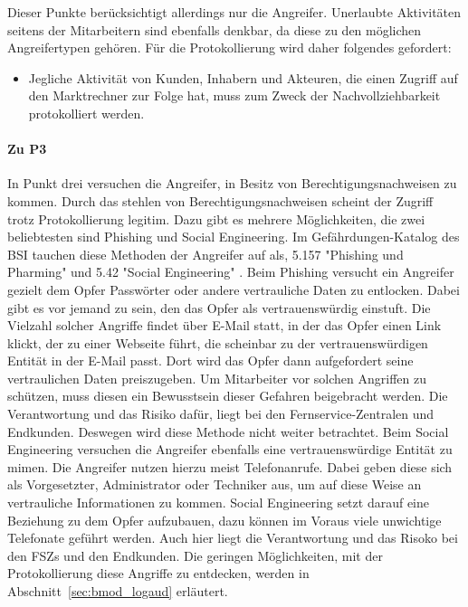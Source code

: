 \documentclass[11pt,a4paper]{report}
\begin{document}
Dieser Punkte berücksichtigt allerdings nur die Angreifer. Unerlaubte Aktivitäten seitens der Mitarbeitern sind ebenfalls denkbar, da diese zu den möglichen Angreifertypen gehören. Für die Protokollierung wird daher folgendes gefordert:

\begin{itemize}[leftmargin=*]
\item Jegliche Aktivität von Kunden, Inhabern und Akteuren, die einen Zugriff auf den Marktrechner zur Folge hat, muss zum Zweck der Nachvollziehbarkeit protokolliert werden.
\end{itemize}

\paragraph{Zu P3} In Punkt drei versuchen die Angreifer, in Besitz von Berechtigungsnachweisen zu kommen. Durch das stehlen von Berechtigungsnachweisen scheint der Zugriff trotz Protokollierung legitim. Dazu gibt es mehrere Möglichkeiten, die zwei beliebtesten sind Phishing und Social Engineering. Im Gefährdungen-Katalog des BSI tauchen diese Methoden der Angreifer auf als, 5.157 "Phishing und Pharming" und 5.42 "Social Engineering" \cite{bsi_g5157, bsi_g5042}. Beim Phishing versucht ein Angreifer gezielt dem Opfer Passwörter oder andere vertrauliche Daten zu entlocken. Dabei gibt es vor jemand zu sein, den das Opfer als vertrauenswürdig einstuft. Die Vielzahl solcher Angriffe findet über E-Mail statt, in der das Opfer einen Link klickt, der zu einer Webseite führt, die scheinbar zu der vertrauenswürdigen Entität in der E-Mail passt. Dort wird das Opfer dann aufgefordert seine vertraulichen Daten preiszugeben. Um Mitarbeiter vor solchen Angriffen zu schützen, muss diesen ein Bewusstsein dieser Gefahren beigebracht werden. Die Verantwortung und das Risiko dafür, liegt bei den Fernservice-Zentralen und Endkunden. Deswegen wird diese Methode nicht weiter betrachtet. Beim Social Engineering versuchen die Angreifer ebenfalls eine vertrauenswürdige Entität zu mimen. Die Angreifer nutzen hierzu meist Telefonanrufe. Dabei geben diese sich als Vorgesetzter, Administrator oder Techniker aus, um auf diese Weise an vertrauliche Informationen zu kommen. Social Engineering setzt darauf eine Beziehung zu dem Opfer aufzubauen, dazu können im Voraus viele unwichtige Telefonate geführt werden. Auch hier liegt die Verantwortung und das Risoko bei den FSZs und den Endkunden. Die geringen Möglichkeiten, mit der Protokollierung diese Angriffe zu entdecken, werden in Abschnitt~\ref{sec:bmod_logaud} erläutert.
\end{document}
